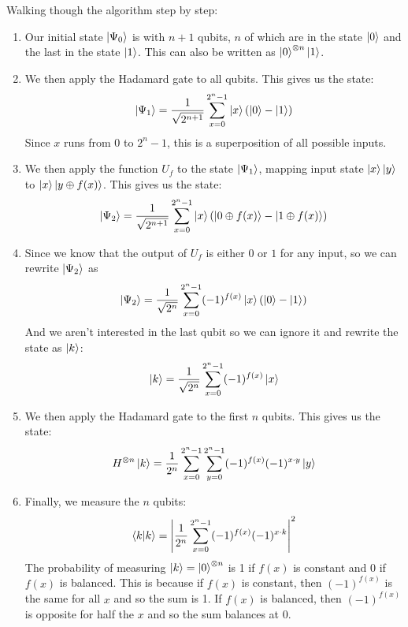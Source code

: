 \documentclass[reqno]{amsart}
\numberwithin{equation}{section}
\numberwithin{figure}{section}
\begin{document}
\begin{justify}
Walking though the algorithm step by step:
    \begin{enumerate}
        \item Our initial state $\ket{\Psi_{0}}$ is with $n+1$ qubits, $n$ of which are in the state $\ket{0}$ and the last in the state $\ket{1}$. This can also be written as $\ket{0}^{\otimes n}\ket{1}$.
        \item We then apply the Hadamard gate to all qubits. This gives us the state:
            \begin{equation*}
                \ket{\Psi_{1}} = \frac{1}{\sqrt{2^{n+1}}}\sum\limits_{x=0}^{2^{n}-1}\ket{x}\left({\ket{0} - \ket{1}}\right)
            \end{equation*}
                Since $x$ runs from 0 to $2^{n}-1$, this is a superposition of all possible inputs.
        \item We then apply the function $U_{f}$ to the state $\ket{\Psi_{1}}$, mapping input state $\ket{x}\ket{y}$ to $\ket{x}\ket{y \oplus f(x)}$. This gives us the state:
            \begin{equation*}
                \ket{\Psi_{2}} = \frac{1}{\sqrt{2^{n+1}}}\sum\limits_{x=0}^{2^{n}-1}\ket{x}\left({\ket{0 \oplus f(x)} - \ket{1 \oplus f(x)}}\right)
            \end{equation*}
        \item Since we know that the output of $U_{f}$ is either $0$ or $1$ for any input, so we can rewrite $\ket{\Psi_{2}}$ as 
            \begin{equation*}
                \ket{\Psi_{2}} = \frac{1}{\sqrt{2^{n}}}\sum\limits_{x=0}^{2^{n}-1}(-1)^{f(x)}\ket{x}\left(\ket{0} - \ket{1}\right)
            \end{equation*}
            And we aren't interested in the last qubit so we can ignore it and rewrite the state as $\ket{k}$:
            \begin{equation*}
                \ket{k} = \frac{1}{\sqrt{2^{n}}}\sum\limits_{x=0}^{2^{n}-1}(-1)^{f(x)}\ket{x}
            \end{equation*}
        \item We then apply the Hadamard gate to the first $n$ qubits. This gives us the state:
            \begin{equation*}
                H^{\otimes n}\ket{k} = \frac{1}{2^{n}}\sum\limits_{x=0}^{2^{n}-1}\sum\limits_{y=0}^{2^{n}-1}(-1)^{f(x)}(-1)^{x \cdot y}\ket{y}
            \end{equation*}
        \item Finally, we measure the $n$ qubits:
            \begin{equation*}
                \braket{k}{k} = \abs{\frac{1}{2^{n}}\sum\limits_{x=0}^{2^{n}-1}(-1)^{f(x)}(-1)^{x\cdot k}}^{2}
            \end{equation*}
            The probability of measuring $\ket{k} = \ket{0}^{\otimes n}$ is 1 if $f(x)$ is constant and 0 if $f(x)$ is balanced. This is because if $f(x)$ is constant, then $(-1)^{f(x)}$ is the same for all $x$ and so the sum is 1. If $f(x)$ is balanced, then $(-1)^{f(x)}$ is opposite for half the $x$ and so the sum balances at 0.
    \end{enumerate}


\end{justify}
\end{document}
